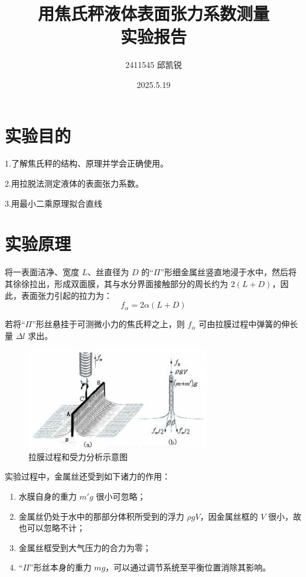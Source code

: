 \documentclass{article}
\title{用焦氏秤液体表面张力系数测量\\实验报告}
\author{2411545 邱凯锐}
\date{2025.5.19}
\begin{document}
\maketitle
\section{实验目的}
1.了解焦氏秤的结构、原理并学会正确使用。

2.用拉脱法测定液体的表面张力系数。

3.用最小二乘原理拟合直线

\section{实验原理}
将一表面洁净、宽度 \(L\)、丝直径为 \(D\) 的“\(\Pi\)”形细金属丝竖直地浸于水中，然后将其徐徐拉出，形成双面膜，其与水分界面接触部分的周长约为 \(2(L + D)\)，因此，表面张力引起的拉力为：
\begin{equation}
f_{\alpha}=2\alpha(L + D)
\end{equation}

若将“\(\Pi\)”形丝悬挂于可测微小力的焦氏秤之上，则 \(f_{\alpha}\) 可由拉膜过程中弹簧的伸长量 \(\Delta l\) 求出。

\begin{figure}[!ht]
    \centering
    \includegraphics[width=8cm]{1.png}
    \caption{拉膜过程和受力分析示意图}
\end{figure}

实验过程中，金属丝还受到如下诸力的作用：
\begin{enumerate}
    \item 水膜自身的重力 \(m'g\) 很小可忽略；
    \item 金属丝仍处于水中的那部分体积所受到的浮力 \(\rho gV\)，因金属丝框的 \(V\) 很小，故也可以忽略不计；
    \item 金属丝框受到大气压力的合力为零；
    \item “\(\Pi\)”形丝本身的重力 \(mg\)，可以通过调节系统至平衡位置消除其影响。
\end{enumerate}
\end{document}
